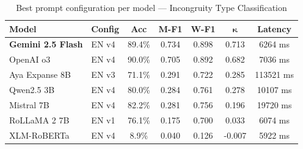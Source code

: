 \begin{table}[H]
\centering
\footnotesize
\caption{Best prompt configuration per model — Incongruity Type Classification}
\label{tab:incongruity-best}
\begin{tabular}{llccccc}
\toprule
\textbf{Model} & \textbf{Config} & \textbf{Acc} & \textbf{M-F1} & \textbf{W-F1} & $\boldsymbol{\kappa}$ & \textbf{Latency} \\
\midrule
\textbf{Gemini 2.5 Flash} & EN v4 & 89.4\% & 0.734 & 0.898 & 0.713 & 6264 ms \\
OpenAI o3 & EN v4 & 90.0\% & 0.705 & 0.892 & 0.682 & 7036 ms \\
Aya Expanse 8B & EN v3 & 71.1\% & 0.291 & 0.722 & 0.285 & 113521 ms \\
Qwen2.5 3B & EN v4 & 80.0\% & 0.284 & 0.761 & 0.278 & 10107 ms \\
Mistral 7B & EN v4 & 82.2\% & 0.281 & 0.756 & 0.196 & 19720 ms \\
RoLLaMA 2 7B & EN v1 & 76.1\% & 0.175 & 0.700 & 0.033 & 6074 ms \\
XLM-RoBERTa & EN v4 & 8.9\% & 0.040 & 0.126 & -0.007 & 5922 ms \\
\bottomrule
\end{tabular}
\end{table}